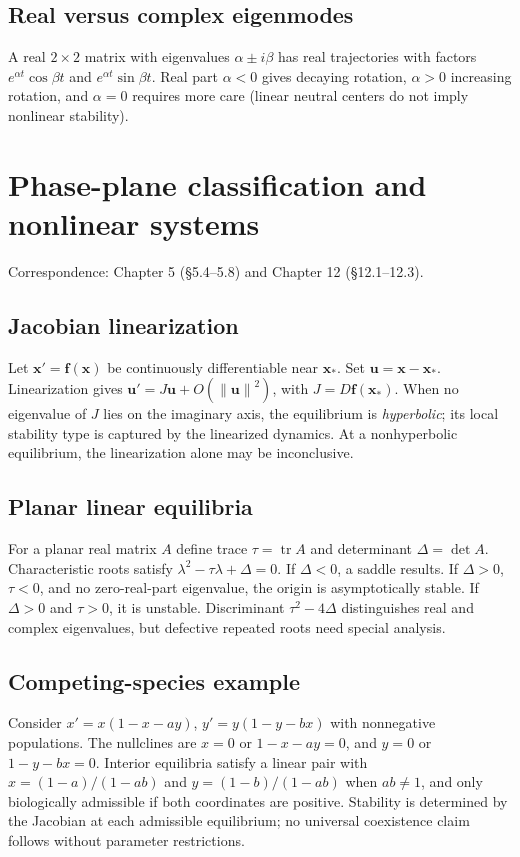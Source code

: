 \documentclass[11pt,letterpaper,oneside]{report}
\theoremstyle{definition}\newtheorem{definition}[theorem]{Definition}
\theoremstyle{remark}\newtheorem{remark}[theorem]{Remark}
\newcommand{\norm}[1]{\left\lVert#1\right\rVert}
\begin{document}
\section{Real versus complex eigenmodes}
A real $2\times2$ matrix with eigenvalues $\alpha\pm i\beta$ has real trajectories with factors $e^{\alpha t}\cos\beta t$ and $e^{\alpha t}\sin\beta t$. Real part $\alpha<0$ gives decaying rotation, $\alpha>0$ increasing rotation, and $\alpha=0$ requires more care (linear neutral centers do not imply nonlinear stability).
\chapter{Phase-plane classification and nonlinear systems}
\begin{bookground}Correspondence: Chapter 5 (\S5.4--5.8) and Chapter 12 (\S12.1--12.3).\end{bookground}
\section{Jacobian linearization}
Let $\mathbf x'=\mathbf f(\mathbf x)$ be continuously differentiable near $\mathbf x_*$. Set $\mathbf u=\mathbf x-\mathbf x_*$. Linearization gives $\mathbf u'=J\mathbf u+O(\norm{\mathbf u}^2)$, with $J=D\mathbf f(\mathbf x_*)$. When no eigenvalue of $J$ lies on the imaginary axis, the equilibrium is \emph{hyperbolic}; its local stability type is captured by the linearized dynamics. At a nonhyperbolic equilibrium, the linearization alone may be inconclusive.
\section{Planar linear equilibria}
For a planar real matrix $A$ define trace $\tau=\operatorname{tr}A$ and determinant $\Delta=\det A$. Characteristic roots satisfy $\lambda^2-\tau\lambda+\Delta=0$. If $\Delta<0$, a saddle results. If $\Delta>0$, $\tau<0$, and no zero-real-part eigenvalue, the origin is asymptotically stable. If $\Delta>0$ and $\tau>0$, it is unstable. Discriminant $\tau^2-4\Delta$ distinguishes real and complex eigenvalues, but defective repeated roots need special analysis.
\section{Competing-species example}
Consider $x'=x(1-x-a y)$, $y'=y(1-y-bx)$ with nonnegative populations. The nullclines are $x=0$ or $1-x-ay=0$, and $y=0$ or $1-y-bx=0$. Interior equilibria satisfy a linear pair with $x=(1-a)/(1-ab)$ and $y=(1-b)/(1-ab)$ when $ab\ne1$, and only biologically admissible if both coordinates are positive. Stability is determined by the Jacobian at each admissible equilibrium; no universal coexistence claim follows without parameter restrictions.
\end{document}
